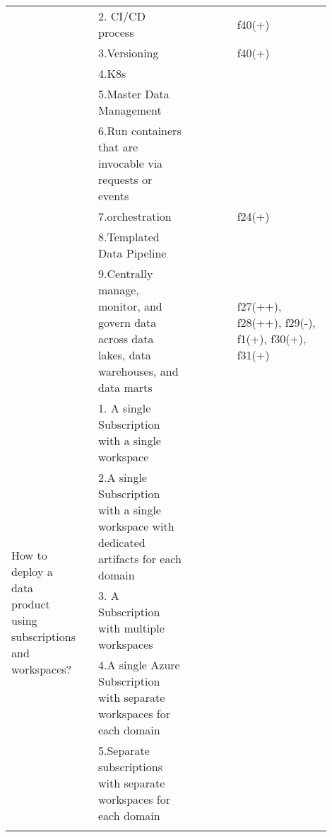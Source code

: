 \begin{tabular}{|p{0.12\linewidth}|p{0.015\linewidth}|p{0.3\linewidth}|p{0.15\linewidth}|p{0.31\linewidth}|}
 & \cellcolor{emerald_shape_5}{} & 2. CI/CD process&\cellcolor{emerald_shape_4}{s6, s19, s28, s30, s35, s51} & f40(+)\\
 & \cellcolor{emerald_shape_5}{} & 3.Versioning&\cellcolor{emerald_shape_6}{s6, s7, s13, s15, s17, s19, s28, s34, s35, s36, s38, s45, s51} & f40(+)\\
 & \cellcolor{emerald_shape_5}{} & 4.K8s&\cellcolor{emerald_shape_4}{s6, s14, s32, s43, s45} & \\
 & \cellcolor{emerald_shape_5}{} & 5.Master Data Management&\cellcolor{emerald_shape_3}{s7, s9, s44} & \\
 & \cellcolor{emerald_shape_5}{} & 6.Run containers that are invocable via requests or events&\cellcolor{emerald_shape_4}{s14, s15, s30, s32, s33, s45} & \\
 & \cellcolor{emerald_shape_5}{} & 7.orchestration&\cellcolor{emerald_shape_3}{s18, s20, s30} & f24(+)\\
 & \cellcolor{emerald_shape_5}{} & 8.Templated Data Pipeline&\cellcolor{emerald_shape_2}{s30, s43} & \\
 & \multirow{-9}{\linewidth}{ \cellcolor{emerald_shape_5}{23}} &9.Centrally manage, monitor, and govern data across data lakes, data warehouses, and data marts&\cellcolor{emerald_shape_1}{s31} & f27(++), f28(++), f29(-), f1(+), f30(+), f31(+)\\
\multirow{5}{\linewidth}{How to deploy a data product using subscriptions and workspaces?} &\cellcolor{emerald_shape_2}{} &1. A single Subscription with a single workspace&\cellcolor{emerald_shape_4}{s36} & \\
 & \cellcolor{emerald_shape_2}{} & 2.A single Subscription with a single workspace with dedicated artifacts for each domain&\cellcolor{emerald_shape_4}{s36} & \\
 & \cellcolor{emerald_shape_2}{} & 3. A Subscription with multiple workspaces&\cellcolor{emerald_shape_4}{s36} & \\
 & \cellcolor{emerald_shape_2}{} & 4.A single Azure Subscription with separate workspaces for each domain&\cellcolor{emerald_shape_4}{s43} & \\
 & \multirow{-5}{\linewidth}{ \cellcolor{emerald_shape_2}{3}} &5.Separate subscriptions with separate workspaces for each domain&\cellcolor{emerald_shape_4}{s38} & \\
\hline
\multicolumn{5}{l}{\parbox{\textwidth}{\smallskip
}}
\end{tabular}
